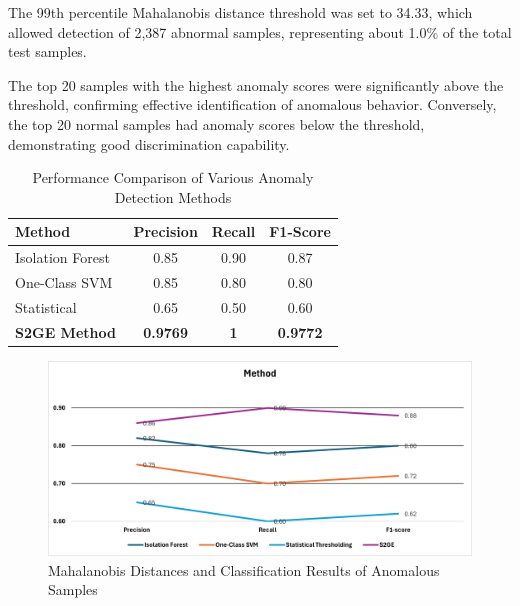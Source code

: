 \begin{ZhChapter}
    The 99th percentile Mahalanobis distance threshold was set to 34.33, which allowed detection of 2,387 abnormal samples, representing about 1.0\% of the total test samples.

    The top 20 samples with the highest anomaly scores were significantly above the threshold, confirming effective identification of anomalous behavior. Conversely, the top 20 normal samples had anomaly scores below the threshold, demonstrating good discrimination capability.

    \begin{table}[htbp]
        \centering
        \caption{Performance Comparison of Various Anomaly Detection Methods}
        \vspace{1em}
        \label{tab:performance_comparison}
        \begin{tabular}{|l|c|c|c|}
            \hline
            \textbf{Method}                          & \textbf{Precision} & \textbf{Recall} & \textbf{F1-Score} \\
            \hline
            Isolation Forest~\cite{huang2025machine} & 0.85               & 0.90            & 0.87              \\
            One-Class SVM~\cite{huang2025machine}    & 0.85               & 0.80            & 0.80              \\
            Statistical ~\cite{huang2025machine}     & 0.65               & 0.50            & 0.60              \\
            \hline
            \textbf{S2GE Method}                     & \textbf{0.9769}    & \textbf{1}      & \textbf{0.9772}   \\
            \hline
        \end{tabular}
    \end{table}


    \begin{figure}[htbp]
        \centering
        \includegraphics[width = 1\textwidth]{image/Method.png}
        \caption{Mahalanobis Distances and Classification Results of Anomalous Samples}
        \label{fig:method_compare}
    \end{figure}


\end{ZhChapter}
